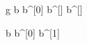 \documentclass[12pt,a4paper]{book}
\begin{document}
\begin{eqcode}{g}{ }{ }{}
  b \in {} \lend
  b^{[0]}  \lend
  b^{[\iter]} \gets b^{[]} \lend
   \lend
   \lend
\end{eqcode}

\begin{eqcode}{\mu}{ }{ }{}
  b \in {} \lend
  b^{[0]} \gets {} \lend
  b^{[1]}  \lend
   \lend
   \lend
\end{eqcode}
\end{document}
